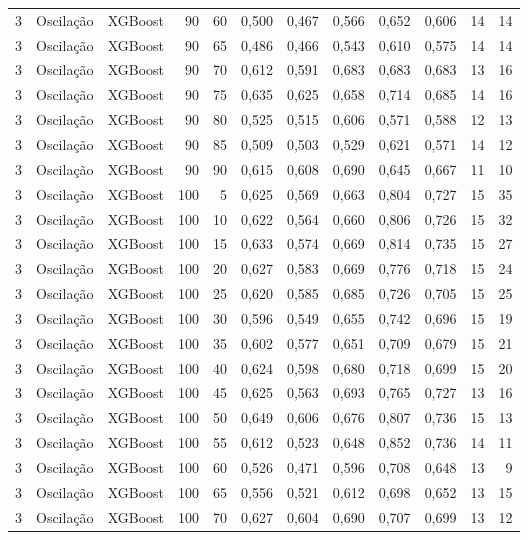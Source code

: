 \begin{longtable}{@{}rllrrrrrrrrr@{}}
3 & Oscilação & XGBoost & 90 & 60 & 0,500 & 0,467 & 0,566 & 0,652 & 0,606 & 14 & 14 \\
3 & Oscilação & XGBoost & 90 & 65 & 0,486 & 0,466 & 0,543 & 0,610 & 0,575 & 14 & 14 \\
3 & Oscilação & XGBoost & 90 & 70 & 0,612 & 0,591 & 0,683 & 0,683 & 0,683 & 13 & 16 \\
3 & Oscilação & XGBoost & 90 & 75 & 0,635 & 0,625 & 0,658 & 0,714 & 0,685 & 14 & 16 \\
3 & Oscilação & XGBoost & 90 & 80 & 0,525 & 0,515 & 0,606 & 0,571 & 0,588 & 12 & 13 \\
3 & Oscilação & XGBoost & 90 & 85 & 0,509 & 0,503 & 0,529 & 0,621 & 0,571 & 14 & 12 \\
3 & Oscilação & XGBoost & 90 & 90 & 0,615 & 0,608 & 0,690 & 0,645 & 0,667 & 11 & 10 \\
3 & Oscilação & XGBoost & 100 & 5 & 0,625 & 0,569 & 0,663 & 0,804 & 0,727 & 15 & 35 \\
3 & Oscilação & XGBoost & 100 & 10 & 0,622 & 0,564 & 0,660 & 0,806 & 0,726 & 15 & 32 \\
3 & Oscilação & XGBoost & 100 & 15 & 0,633 & 0,574 & 0,669 & 0,814 & 0,735 & 15 & 27 \\
3 & Oscilação & XGBoost & 100 & 20 & 0,627 & 0,583 & 0,669 & 0,776 & 0,718 & 15 & 24 \\
3 & Oscilação & XGBoost & 100 & 25 & 0,620 & 0,585 & 0,685 & 0,726 & 0,705 & 15 & 25 \\
3 & Oscilação & XGBoost & 100 & 30 & 0,596 & 0,549 & 0,655 & 0,742 & 0,696 & 15 & 19 \\
3 & Oscilação & XGBoost & 100 & 35 & 0,602 & 0,577 & 0,651 & 0,709 & 0,679 & 15 & 21 \\
3 & Oscilação & XGBoost & 100 & 40 & 0,624 & 0,598 & 0,680 & 0,718 & 0,699 & 15 & 20 \\
3 & Oscilação & XGBoost & 100 & 45 & 0,625 & 0,563 & 0,693 & 0,765 & 0,727 & 13 & 16 \\
3 & Oscilação & XGBoost & 100 & 50 & 0,649 & 0,606 & 0,676 & 0,807 & 0,736 & 15 & 13 \\
3 & Oscilação & XGBoost & 100 & 55 & 0,612 & 0,523 & 0,648 & 0,852 & 0,736 & 14 & 11 \\
3 & Oscilação & XGBoost & 100 & 60 & 0,526 & 0,471 & 0,596 & 0,708 & 0,648 & 13 & 9 \\
3 & Oscilação & XGBoost & 100 & 65 & 0,556 & 0,521 & 0,612 & 0,698 & 0,652 & 13 & 15 \\
3 & Oscilação & XGBoost & 100 & 70 & 0,627 & 0,604 & 0,690 & 0,707 & 0,699 & 13 & 12 \\

\end{longtable}
